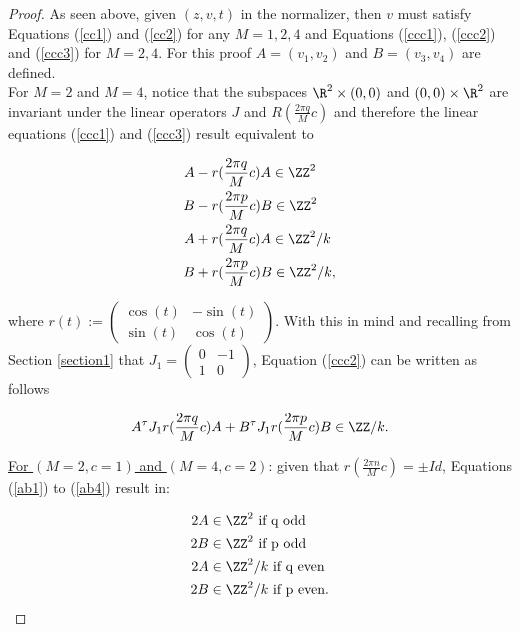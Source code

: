 \documentclass[12pt]{amsart}
\theoremstyle{plain}
\theoremstyle{definition}
\theoremstyle{remark}
\begin{document}
\begin{proof}
    As seen above, given $(z,v,t)$ in the normalizer, then $v$ must satisfy Equations (\ref{cc1}) and (\ref{cc2}) for any $M=1,2,4$ and Equations (\ref{ccc1}), (\ref{ccc2}) and (\ref{ccc3}) for $M=2,4$. For this proof $A=(v_1,v_2)$ and $B=(v_3,v_4)$ are defined.\\

    For $M=2$ and $M=4$, notice that the subspaces $\R^2 \times {(0,0)}$ and ${(0,0)} \times \R^2$ are invariant under the linear operators $J$ and $R(\frac{2 \pi q}{M}c)$ and therefore the linear equations (\ref{ccc1}) and (\ref{ccc3}) result equivalent to 

    \begin{align}
    A& - r(\frac{2 \pi q}{M}c) A \in \ZZ^2 \label{ab1}\\
    B& - r(\frac{2 \pi p}{M}c) B \in \ZZ^2 \label{ab2}\\
    A& + r(\frac{2 \pi q}{M}c) A \in \ZZ^2/k \label{ab3}\\
    B& + r(\frac{2 \pi p}{M}c) B \in \ZZ^2/k \label{ab4},
    \end{align}

where $r(t) := \left( \begin{matrix} 
\cos(t) & -\sin(t)\\
\sin(t) & \cos(t)
\end{matrix}
\right)$. With this in mind and recalling from Section \ref{section1} that $J_1 = \left( \begin{matrix} 
0 & -1\\
1 & 0
\end{matrix}
\right)$, Equation (\ref{ccc2}) can be written as follows

\begin{equation}
    A^{\tau} J_1 r(\frac{2 \pi q}{M}c) A + B^{\tau} J_1 r(\frac{2 \pi p}{M}c) B \in \ZZ/k. \label{ab5}
\end{equation}

\underline{For $(M=2, c=1)$ and $(M=4, c=2)$}: given that $r(\frac{2 \pi n}{M}c) = \pm Id $, Equations (\ref{ab1}) to (\ref{ab4}) result in:


\begin{align}
    2A& \in \ZZ^2 \text{ if q odd} \label{ab6}\\
    2B& \in \ZZ^2 \text{ if p odd} \label{ab7}\\
    2A& \in \ZZ^2/k \text{ if q even} \nonumber \\
    2B& \in \ZZ^2/k \text{ if p even}. \nonumber
\end{align}


\end{proof}
\end{document}
